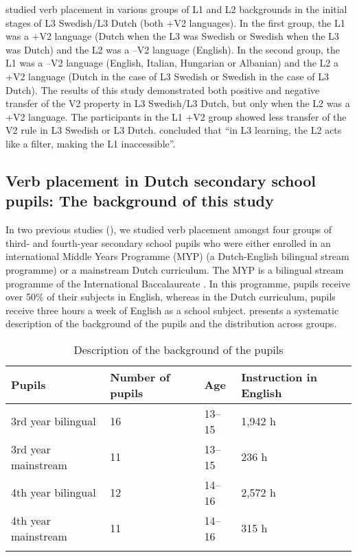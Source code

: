 \documentclass[output=paper,modfonts,nonflat, newtxmath]{langsci/langscibook}
\begin{document}
\citet{BardelFalk2007} studied verb placement in various groups of L1 and L2 backgrounds in the initial stages of L3 Swedish/L3 Dutch (both +V2 languages). In the first group, the L1 was a +V2 language (Dutch when the L3 was Swedish or Swedish when the L3 was Dutch) and the L2 was a –V2 language (English). In the second group, the L1 was a –V2 language (English, Italian, Hungarian or Albanian) and the L2 a +V2 language (Dutch in the case of L3 Swedish or Swedish in the case of L3 Dutch). The results of this study demonstrated both positive and negative transfer of the V2 property in L3 Swedish/L3 Dutch, but only when the L2 was a +V2 language. The participants in the L1 +V2 group showed less transfer of the V2 rule in L3 Swedish or L3 Dutch. \citet[480]{BardelFalk2007} concluded that “in L3 learning, the L2 acts like a filter, making the L1 inaccessible”.

\subsection{{Verb} {placement} {in} {Dutch} {secondary} {school} {pupils:} {The} {background} {of} {this} {study}}%
\label{sec:stadt:2.3}

In two previous studies (\citealt{StadtEtAl2016, StadtEtAl2018Exposure}), we studied verb placement amongst four groups of third- and fourth-year secondary school pupils who were either enrolled in an international Middle Years Programme (MYP) (a Dutch-English bilingual stream programme) or a mainstream Dutch curriculum. The MYP is a bilingual stream programme of the International Baccalaureate \citep{IBO2019}. In this programme, pupils receive over 50\% of their subjects in English, whereas in the Dutch curriculum, pupils receive three hours a week of English as a school subject.  presents a systematic description of the background of the pupils and the distribution across groups.

\begin{table}
\caption{ Description of the background of the pupils}
\label{tab:stadt:1}

\begin{tabularx}{.85\textwidth}{p{3.8cm} Y Y Y}
\lsptoprule
Pupils &  Number of \newline pupils & Age & Instruction \newline in English\\
	\midrule
3rd year bilingual &  16 & 13--15 & 1,942 h\\
3rd year mainstream &  11 & 13--15 & 236 h\\
4th year bilingual &   12 & 14--16 & 2,572 h\\
4th year mainstream &  11 & 14--16 & 315 h\\
\lspbottomrule
\end{tabularx}
\end{table}
\end{document}
